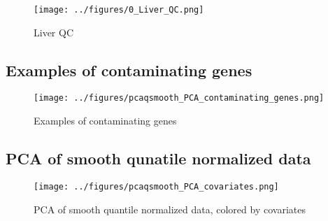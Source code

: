 \documentclass{article}
\begin{document}
\begin{figure}[htbp]
  \centering
  \texttt{[image: ../figures/0\_Liver\_QC.png]}
  \caption{Liver QC}
  \label{fig:0_Liver_QC}
\end{figure}

\FloatBarrier
\subsection{Examples of contaminating genes}
\begin{figure}[htbp]
  \centering
  \texttt{[image: ../figures/pcaqsmooth\_PCA\_contaminating\_genes.png]}
  \caption{Examples of contaminating genes}
  \label{fig:contaminating_genes}
\end{figure}

\subsection{PCA of smooth qunatile normalized data}
\begin{figure}[htbp]
  \centering
  \texttt{[image: ../figures/pcaqsmooth\_PCA\_covariates.png]}
  \caption{PCA of smooth quantile normalized data, colored by covariates}
  \label{fig:pca_covariates}
\end{figure}





\end{document}
